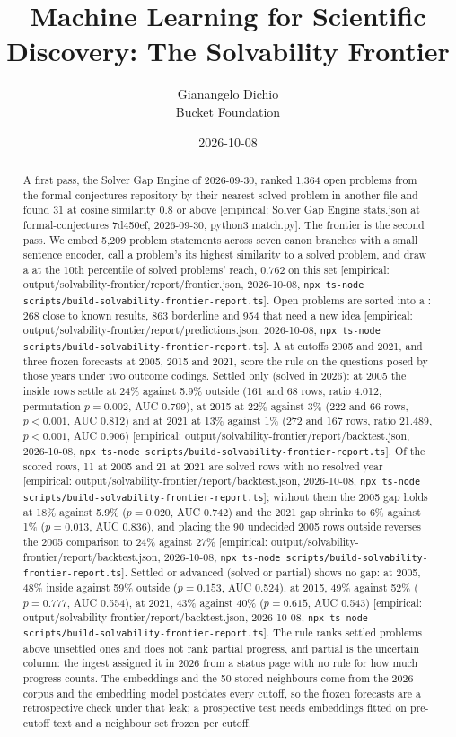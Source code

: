 \documentclass[11pt]{article}
\title{Machine Learning for Scientific Discovery: The Solvability Frontier}
\author{Gianangelo Dichio\\Bucket Foundation}
\date{2026-10-08}
\newcommand{\emp}[1]{\textcolor{bucketgray}{\footnotesize [empirical: #1]}}
\newcommand{\cmd}{\texttt{npx ts-node scripts/build-solvability-frontier-report.ts}}
\newcommand{\bt}{\emp{output/solvability-frontier/report/backtest.json, 2026-10-08, \cmd}}
\newcommand{\fr}{\emp{output/solvability-frontier/report/frontier.json, 2026-10-08, \cmd}}
\newcommand{\pr}{\emp{output/solvability-frontier/report/predictions.json, 2026-10-08, \cmd}}
\newcommand{\sg}{\emp{Solver Gap Engine stats.json at formal-conjectures 7d450ef, 2026-09-30, python3 match.py}}
\begin{document}
\maketitle

\begin{abstract}
A first pass, the Solver Gap Engine of 2026-09-30, ranked 1,364 open problems from the formal-conjectures repository by their nearest solved problem in another file and found 31 at cosine similarity 0.8 or above \sg. The frontier is the second pass. We embed 5,209 problem statements across seven canon branches with a small sentence encoder, call a problem's  its highest similarity to a solved problem, and draw a  at the 10th percentile of solved problems' reach, 0.762 on this set \fr. Open problems are sorted into a : 268 close to known results, 863 borderline and 954 that need a new idea \pr. A  at cutoffs 2005 and 2021, and three frozen forecasts at 2005, 2015 and 2021, score the rule on the questions posed by those years under two outcome codings. Settled only (solved in 2026): at 2005 the inside rows settle at 24\% against 5.9\% outside (161 and 68 rows, ratio 4.012, permutation $p=0.002$, AUC 0.799), at 2015 at 22\% against 3\% (222 and 66 rows, $p<0.001$, AUC 0.812) and at 2021 at 13\% against 1\% (272 and 167 rows, ratio 21.489, $p<0.001$, AUC 0.906) \bt. Of the scored rows, 11 at 2005 and 21 at 2021 are solved rows with no resolved year \bt; without them the 2005 gap holds at 18\% against 5.9\% ($p=0.020$, AUC 0.742) and the 2021 gap shrinks to 6\% against 1\% ($p=0.013$, AUC 0.836), and placing the 90 undecided 2005 rows outside reverses the 2005 comparison to 24\% against 27\% \bt. Settled or advanced (solved or partial) shows no gap: at 2005, 48\% inside against 59\% outside ($p=0.153$, AUC 0.524), at 2015, 49\% against 52\% ($p=0.777$, AUC 0.554), at 2021, 43\% against 40\% ($p=0.615$, AUC 0.543) \bt. The rule ranks settled problems above unsettled ones and does not rank partial progress, and partial is the uncertain column: the ingest assigned it in 2026 from a status page with no rule for how much progress counts. The embeddings and the 50 stored neighbours come from the 2026 corpus and the embedding model postdates every cutoff, so the frozen forecasts are a retrospective check under that leak; a prospective test needs embeddings fitted on pre-cutoff text and a neighbour set frozen per cutoff.
\end{abstract}
\end{document}
